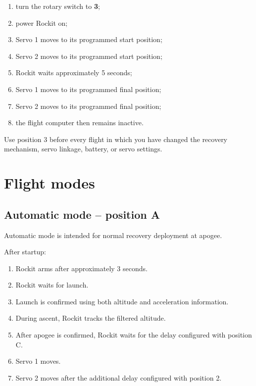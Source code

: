 \documentclass[11pt,a4paper]{article}
\begin{document}
\begin{enumerate}
    \item turn the rotary switch to \textbf{3};
    \item power Rockit on;
    \item Servo 1 moves to its programmed start position;
    \item Servo 2 moves to its programmed start position;
    \item Rockit waits approximately 5 seconds;
    \item Servo 1 moves to its programmed final position;
    \item Servo 2 moves to its programmed final position;
    \item the flight computer then remains inactive.
\end{enumerate}

\begin{importantbox}
Use position 3 before every flight in which you have changed the recovery mechanism, servo linkage, battery, or servo settings.
\end{importantbox}

\section{Flight modes}

\subsection{Automatic mode -- position A}

Automatic mode is intended for normal recovery deployment at apogee.

After startup:

\begin{enumerate}
    \item Rockit arms after approximately 3 seconds.
    \item Rockit waits for launch.
    \item Launch is confirmed using both altitude and acceleration information.
    \item During ascent, Rockit tracks the filtered altitude.
    \item After apogee is confirmed, Rockit waits for the delay configured with position C.
    \item Servo 1 moves.
    \item Servo 2 moves after the additional delay configured with position 2.
\end{enumerate}
\end{document}
